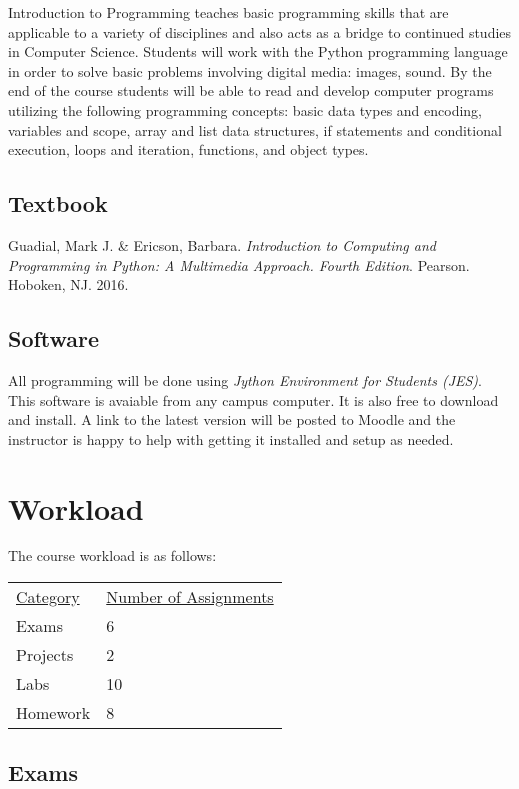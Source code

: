 \documentclass[10pt]{article}
\begin{document}
Introduction to Programming teaches basic programming skills that are applicable to a variety of disciplines and also acts as a bridge to continued studies in Computer Science. Students will work with the Python programming language in order to solve basic problems involving digital media: images, sound.  By the end of the course students will be able to read and develop computer programs utilizing the following programming concepts: basic data types and encoding, variables and scope, array and list data structures, if statements and conditional execution, loops and iteration, functions, and object types.

\subsection{Textbook}

\noindent
Guadial, Mark J. \& Ericson, Barbara. \textit{Introduction to Computing and Programming in Python: A Multimedia Approach. Fourth Edition}. Pearson. Hoboken, NJ. 2016. %

\subsection{Software}

All programming will be done using \textit{Jython Environment for Students (JES)}. This software is avaiable from any campus computer. It is also free to download and install. A link to the latest version will be posted to Moodle and the instructor is happy to help with getting it installed and setup as needed.

\section{Workload}

The course workload is as follows:
\begin{center}
  \begin{tabular}{ll}
    \underline{Category} & \underline{Number of Assignments} \\
    Exams & 6 \\
    Projects & 2 \\
    Labs & 10 \\
    Homework & 8
  \end{tabular}
\end{center}


\subsection*{Exams}
\end{document}
